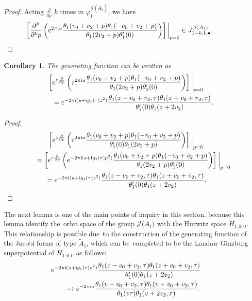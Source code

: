 \documentclass[pdftex]{sigma}%
\numberwithin{equation}{section}
\newtheorem{Corollary}[Theorem]{Corollary}
\newcommand{\Ja}{\mathcal{J}}
\begin{document}
\begin{proof}
Acting $\frac{\partial}{\partial p}$ $k$ times in $\varphi_1^{\Ja(\tilde A_1)}$, we have
\begin{gather*}
\left[ \frac{\partial^k}{\partial ^k p}\left({\rm e}^{2\pi {\rm i} u}\frac{\theta_1(v_0+v_2+p)\theta_1(-v_0+v_2+p)}{\theta_1(2v_2+p)\theta_1^{\prime}(0)}\right) \right]
\bigg |_{p=0} \in J_{1-k,1,\bullet}^{\Ja(\tilde A_1)}.
\tag*{\qed}
\end{gather*}
\renewcommand{\qed}{}
\end{proof}

\begin{Corollary}
The generating function can be written as
\begin{gather*}
\left[ {\rm e}^{z\frac{\partial}{\partial p} } \left({\rm e}^{2\pi {\rm i} u}\frac{\theta_1(v_0+v_2+p)
\theta_1(-v_0+v_2+p)}{\theta_1(2v_2+p)\theta_1^{\prime}(0)}\right) \right]\bigg |_{p=0}\nonumber
\\ \qquad
{}={\rm e}^{-2\pi {\rm i}(u+ {\rm i}g_1(\tau)z^2)}\frac{\theta_1(z-v_0+v_2,\tau)\theta_1(z+v_0+v_2,\tau)}{\theta_1^{\prime}(0)\theta_1(z+2v_2)}.
\end{gather*}
\end{Corollary}

\begin{proof}
\begin{gather*}
\left[ {\rm e}^{z\frac{\partial}{\partial p} } \left({\rm e}^{2\pi {\rm i} u}\frac{\theta_1(v_0+v_2+p)
\theta_1(-v_0+v_2+p)}{\theta_1^{\prime}(0)\theta_1(2v_2+p)}\right) \right]\bigg |_{p=0}
\\ \qquad
{}=\left[ {\rm e}^{z\frac{\partial}{\partial p} } \left({\rm e}^{-2\pi {\rm i}(s+ {\rm i}g_1(\tau)p^2)}
\frac{\theta_1(v_0+v_2+p)\theta_1(-v_0+v_2+p)}{\theta_1(2v_2+p)\theta_1^{\prime}(0)}\right) \right]\bigg |_{p=0}
\\ \qquad
{}={\rm e}^{-2\pi {\rm i}(u+ {\rm i}g_1(\tau)z^2)}\frac{\theta_1(z-v_0+v_2,\tau) \theta_1(z+v_0+v_2,\tau)}{\theta_1^{\prime}(0)\theta_1(z+2v_2)}.\tag*{\qed}
\end{gather*}
\renewcommand{\qed}{}
\end{proof}

The next lemma is one of the main points of inquiry in this section, because this lemma identify the~orbit space of the group $\Ja\big(\tilde A_1\big)$ with the Hurwitz space $H_{1,0,0}$. This relationship is possible due~to the construction of the generating function of the Jacobi forms of type $\tilde A_1$, which can be~completed to be the Landau--Ginzburg superpotential of $H_{1,0,0}$ as follows:
\begin{gather*}
{\rm e}^{-2\pi {\rm i}(u+ {\rm i}g_1(\tau)z^2)}\frac{\theta_1(z-v_0+v_2,\tau)\theta_1(z+v_0+v_2,\tau)}
{\theta_1^{\prime}(0)\theta_1(z+2v_2)}
\\ \qquad{}
\mapsto {\rm e}^{-2\pi {\rm i} u}\frac{\theta_1(v-v_0+v_2,\tau) \theta_1(v+v_0+v_2,\tau)}{\theta_1(v\tau)\theta_1(v+2v_2,\tau)}.
\end{gather*}
\end{document}
